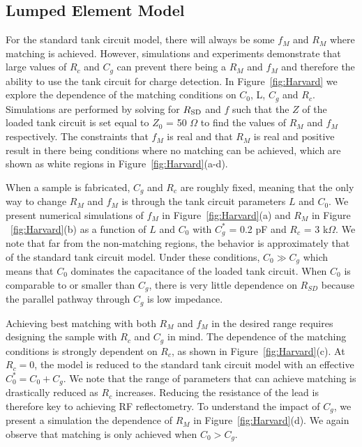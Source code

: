 \documentclass{article}
\begin{document}
\subsection{Lumped Element Model}

For the standard tank circuit model, there will always be some $f_M$ and $R_M$ where matching is achieved.  However, simulations and experiments demonstrate that large values of $R_c$ and $C_g$ can prevent there being a $R_M$ and $f_M$ and therefore the ability to use the tank circuit for charge detection.  In Figure\ \ref{fig:Harvard} we explore the dependence of the matching conditions on $C_0$, L, $C_g$ and $R_c$.  Simulations are performed by solving for $R_{\rm SD}$ and $f$ such that the $Z$ of the loaded tank circuit is set equal to $Z_0$ = 50 $\Omega$ to find the values of $R_M$ and $f_M$ respectively.  The constraints that $f_M$ is real and that $R_M$ is real and positive result in there being conditions where no matching can be achieved, which are shown as white regions in Figure\ \ref{fig:Harvard}(a-d).

When a sample is fabricated, $C_g$ and $R_c$ are roughly fixed, meaning that the only way to change $R_M$ and $f_M$ is through the tank circuit parameters $L$ and $C_0$.  We present numerical simulations of $f_M$ in Figure\ \ref{fig:Harvard}(a) and $R_M$ in Figure \ \ref{fig:Harvard}(b) as a function of $L$ and $C_0$ with $C^*_g$ = 0.2 pF and $R_c$ = 3 k$\Omega$.    We note that far from the non-matching regions, the behavior is approximately that of the standard tank circuit model.  Under these conditions, $C_0\gg C_g$ which means that $C_0$ dominates the capacitance of the loaded tank circuit.  When $C_0$ is comparable to or smaller than $C_g$, there is very little dependence on $R_{SD}$ because the parallel pathway through $C_g$ is low impedance.  

Achieving best matching with both $R_M$ and $f_M$ in the desired range requires designing the sample with $R_c$ and $C_g$ in mind.  The dependence of the matching conditions is strongly dependent on $R_c$, as shown in Figure\ \ref{fig:Harvard}(c).  At $R_c=0$, the model is reduced to the standard tank circuit model with an effective $C_0^*=C_0+C_g$.  We note that the range of parameters that can achieve matching is drastically reduced as $R_c$ increases.  Reducing the resistance of the lead is therefore key to achieving RF reflectometry.  To understand the impact of $C_g$, we present a simulation the dependence of $R_M$ in Figure\ \ref{fig:Harvard}(d).  We again observe that matching is only achieved when $C_0>C_g$.
\end{document}
